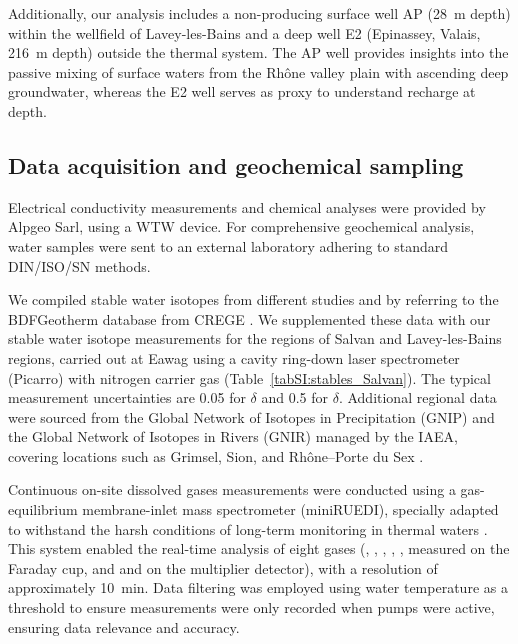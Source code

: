Additionally, our analysis includes a non-producing surface well AP (\SI{28}{\meter} depth) within the wellfield of Lavey-les-Bains and a deep well E2 (Epinassey, Valais, \SI{216}{\meter} depth) outside the thermal system. 
The AP well provides insights into the passive mixing of surface waters from the Rhône valley plain with ascending deep groundwater, whereas the E2 well serves as proxy to understand recharge at depth.

\subsection{Data acquisition and geochemical sampling}
Electrical conductivity measurements and chemical analyses were provided by Alpgeo Sarl, using a WTW device.
For comprehensive geochemical analysis, water samples were sent to an external laboratory adhering to standard DIN/ISO/SN methods.

We compiled stable water isotopes from different studies \citep{vuataz1982hydrogeologie,sonney2009numerical,sonney2010groundwater} and by referring to the BDFGeotherm database from CREGE \citep{sonney2010database}.
We supplemented these data with our stable water isotope measurements for the regions of Salvan and Lavey-les-Bains regions, carried out at Eawag using a cavity ring-down laser spectrometer (Picarro) with nitrogen carrier gas (Table~\ref{tabSI:stables_Salvan}). 
The typical measurement uncertainties are \SI{0.05}{\permille} for $\delta$ and \SI{0.5}{\permille} for $\delta$.
Additional regional data were sourced from the Global Network of Isotopes in Precipitation (GNIP) and the Global Network of Isotopes in Rivers (GNIR) managed by the IAEA, covering locations such as Grimsel, Sion, and Rhône--Porte du Sex \citep{iaea2024GNIP, iaea2024GNIR, naqua2024isot}.

Continuous on-site dissolved gases measurements were conducted using a gas-equilibrium membrane-inlet mass spectrometer (miniRUEDI), specially adapted to withstand the harsh conditions of long-term monitoring in thermal waters \citep{giroud2023new, brennwald2016portable}.
This system enabled the real-time analysis of eight gases (, , , , ,  measured on the Faraday cup, and  and  on the multiplier detector), with a resolution of approximately \SI{10}{\minute}.
Data filtering was employed using water temperature as a threshold to ensure measurements were only recorded when pumps were active, ensuring data relevance and accuracy.

